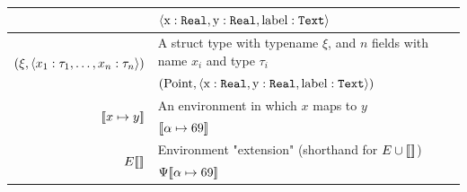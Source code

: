 \begin{table}[!ht]
{\begin{tabular}{rl}
	                                                                                            		& $\left<\text{x}:\texttt{Real}, \text{y}:\texttt{Real}, \text{label}:\texttt{Text}\right>$                        \\\hline
			\multirow{2}{*}{$(\xi, \left<x_1:\tau_1,\dotsc,x_n:\tau_n\right>)$}                              & A struct type with typename $\xi$, and $n$ fields with name $x_i$ and type $\tau_i$ \\
	                                                                                            		& $(\text{Point}, \left<\text{x}:\texttt{Real}, \text{y}:\texttt{Real}, \text{label}:\texttt{Text}\right>)$        \\\hline
			\multirow{2}{*}{$[\![x \mapsto y]\!]$}                                                        & An environment in which $x$ maps to $y$                                             \\
	                                                                                            		& $[\![\alpha \mapsto 69]\!]$                                                            \\\hline
			\multirow{2}{*}{$E[\![]\!]$}                                                                  & Environment "extension" (shorthand for $E\cup[\![]\!]$)                               \\
	                                                                                            		& $\Psi[\![\alpha \mapsto 69]\!]$                                                   \\\hline
		\end{tabular}
	}
\end{table}



